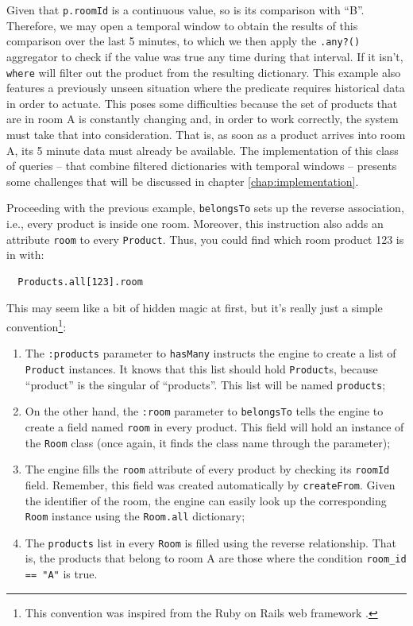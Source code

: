 Given that \verb=p.roomId= is a continuous value, so is its comparison
with ``B''. Therefore, we may open a temporal window to obtain the
results of this comparison over the last 5 minutes, to which we then
apply the \verb=.any?()= aggregator to check if the value was true any
time during that interval. If it isn't, \verb=where= will filter out
the product from the resulting dictionary. This example also features
a previously unseen situation where the predicate requires historical
data in order to actuate. This poses some difficulties because the set
of products that are in room A is constantly changing and, in order to
work correctly, the system must take that into consideration. That is,
as soon as a product arrives into room A, its 5 minute data must
already be available. The implementation of this class of queries --
that combine filtered dictionaries with temporal windows -- presents
some challenges that will be discussed in chapter
\ref{chap:implementation}.

Proceeding with the previous example, \verb=belongsTo= sets up the
reverse association, i.e., every product is inside one room. Moreover,
this instruction also adds an attribute \verb=room= to every
\verb=Product=. Thus, you could find which room product 123 is in
with:

\begin{lstlisting}
  Products.all[123].room
\end{lstlisting}

This may seem like a bit of hidden magic at first, but it's really
just a simple convention\footnote{This convention was inspired from
  the Ruby on Rails web framework \cite{ror:www}.}:

\begin{enumerate}
\item The \verb=:products= parameter to \verb=hasMany= instructs the
  engine to create a list of \verb=Product= instances. It knows that
  this list should hold \verb=Product=s, because ``product'' is the
  singular of ``products''. This list will be named \verb=products=;
\item On the other hand, the \verb=:room= parameter to
  \verb=belongsTo= tells the engine to create a field named
  \verb=room= in every product. This field will hold an instance of
  the \verb=Room= class (once again, it finds the class name through
  the parameter);
\item The engine fills the \verb=room= attribute of every product by
  checking its \verb=roomId= field. Remember, this field was created
  automatically by \verb=createFrom=. Given the identifier of the
  room, the engine can easily look up the corresponding \verb=Room=
  instance using the \verb=Room.all= dictionary;
\item The \verb=products= list in every \verb=Room= is filled using
  the reverse relationship. That is, the products that belong to room
  A are those where the condition \verb!room_id == "A"! is true.
\end{enumerate}

